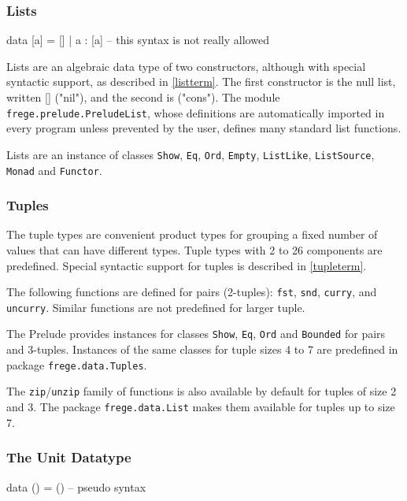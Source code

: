 \subsubsection{Lists} \label{listtype}  

\begin{code}
data [a] = [] | a : [a]    -- this syntax is not really allowed
\end{code}

Lists are an algebraic data type of two constructors, although with special syntactic support, as described in \autoref{listterm}.
The first constructor is the null list, written [] ("nil"), and the second is \sym{:} ("cons"). The module \texttt{frege.prelude.PreludeList}, whose definitions are automatically imported in every \frege{} program unless prevented by the user, defines many standard list functions.

Lists are an instance of classes \texttt{Show}, \texttt{Eq}, \texttt{Ord}, \texttt{Empty}, \texttt{ListLike}, \texttt{ListSource}, \texttt{Monad} and \texttt{Functor}.


\subsubsection{Tuples} \label{tupletypes}  

The tuple types are convenient product types for grouping a fixed number of  values that can have different types. Tuple types with 2 to 26 components are predefined. Special syntactic support for tuples is described in \autoref{tupleterm}.

The following functions are defined for pairs (2-tuples): \texttt{fst}, \texttt{snd}, \texttt{curry}, and \texttt{uncurry}. Similar functions are not predefined for larger tuple.

The Prelude provides instances for classes \texttt{Show}, \texttt{Eq}, \texttt{Ord} and \texttt{Bounded} for pairs and 3-tuples. 
Instances of the same classes for tuple sizes 4 to 7 are predefined in package \texttt{frege.data.Tuples}.

The \texttt{zip}/\texttt{unzip} family of functions is also available by default for tuples of size 2 and 3. 
The package \texttt{frege.data.List} makes them available for tuples up to size 7.


\subsubsection{The Unit Datatype} \label{unittype} 
\begin{code}
data () = ()    -- pseudo syntax
\end{code}

